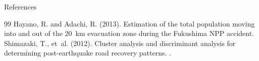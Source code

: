 \documentclass[aspectratio=169]{beamer}
\begin{document}
\begin{frame}[allowframebreaks]{References}

\begin{thebibliography}{99}
Hayano, R. and Adachi, R. (2013).
\newblock Estimation of the total population moving into and out of the
20~km evacuation zone during the Fukushima NPP accident.
Shimazaki, T., et~al. (2012).
\newblock Cluster analysis and discriminant analysis for determining
post-earthquake road recovery patterns.
.
\end{thebibliography}
\end{frame}
\end{document}
